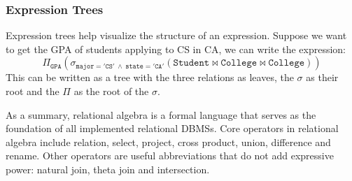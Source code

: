 \subsubsection{Expression Trees}
Expression trees help visualize the structure of an expression. Suppose we want to get the GPA of students applying to CS in CA, we can write the expression:
\begin{equation*}
\mathtt{\Pi_{GPA}(\sigma_{major='CS'\:\land\:state='CA'}(Student\bowtie College\bowtie College))}
\end{equation*}
This can be written as a tree with the three relations as leaves, the $\sigma$ as their root and the $\Pi$ as the root of the $\sigma$.

As a summary, relational algebra is a formal language that serves as the foundation of all implemented relational DBMSs. Core operators in relational algebra include relation, select, project, cross product, union, difference and rename. Other operators are useful abbreviations that do not add expressive power: natural join, theta join and intersection. 
\ifx\PREAMBLE\undefined

\fi